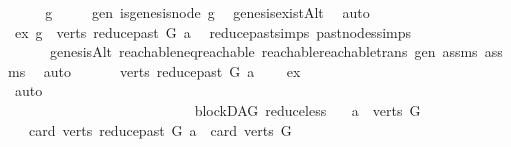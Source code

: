 \begin{isabellebody}
%
\endisadelimproof
%
\isatagproof
{}\isamarkupfalse%
\ {\isacharminus}{\kern0pt}\isanewline
\ \ \isamarkupfalse%
\ g\isanewline
\ \ \ \ \ gen{\isacharcolon}{\kern0pt}\ {\isachardoublequoteopen}is{\isacharunderscore}{\kern0pt}genesis{\isacharunderscore}{\kern0pt}node\ g{\isachardoublequoteclose}\ \isamarkupfalse%
\ genesis{\isacharunderscore}{\kern0pt}existAlt\ \isamarkupfalse%
\ auto\isanewline
\ \ \isamarkupfalse%
\ ex{\isacharcolon}{\kern0pt}\ {\isachardoublequoteopen}g\ {\isasymin}\ verts\ {\isacharparenleft}{\kern0pt}reduce{\isacharunderscore}{\kern0pt}past\ G\ a{\isacharparenright}{\kern0pt}{\isachardoublequoteclose}\ \isamarkupfalse%
\ reduce{\isacharunderscore}{\kern0pt}past{\isachardot}{\kern0pt}simps\ past{\isacharunderscore}{\kern0pt}nodes{\isachardot}{\kern0pt}simps\ \isanewline
\ \ \ \ \ \ genesisAlt\ reachable{\isacharunderscore}{\kern0pt}neq{\isacharunderscore}{\kern0pt}reachable{}\ reachable{\isacharunderscore}{\kern0pt}reachable{}{\isacharunderscore}{\kern0pt}trans\ gen\ assms{\isacharparenleft}{\kern0pt}{}{\isacharparenright}{\kern0pt}\ assms{\isacharparenleft}{\kern0pt}{}{\isacharparenright}{\kern0pt}\ \isamarkupfalse%
\ auto\ \isanewline
\ \ \isamarkupfalse%
\ \isamarkupfalse%
\ {\isachardoublequoteopen}{\isacharparenleft}{\kern0pt}verts\ {\isacharparenleft}{\kern0pt}reduce{\isacharunderscore}{\kern0pt}past\ G\ a{\isacharparenright}{\kern0pt}{\isacharparenright}{\kern0pt}\ {\isasymnoteq}\ {\isacharbraceleft}{\kern0pt}{\isacharbraceright}{\kern0pt}{\isachardoublequoteclose}\ \isamarkupfalse%
\ ex\ \isamarkupfalse%
\ auto\ \ \ \ \ \ \ \ \ \ \ \ \ \ \ \ \ \ \ \ \ \ \ \ \ \ \ \ \ \ \ \ \ \ \ \ \ \ \ \ \ \ \ \ \ \ \ \ \ \ \ \ \ \ \ \ \ \ \ \ \ \ \ \ \ \ \ \ \ \ \ \ \ \ \ \ \ \ \ \ \ \ \ \ \ \ \ \ \ \ \ \isanewline
{}\isamarkupfalse%
%
\endisatagproof
{\isafoldproof}%
%
\isadelimproof
\isanewline
%
\endisadelimproof
\isanewline
{}\isamarkupfalse%
\ {\isacharparenleft}{\kern0pt}\ blockDAG{\isacharparenright}{\kern0pt}\ reduce{\isacharunderscore}{\kern0pt}less{\isacharcolon}{\kern0pt}\isanewline
\ \ \ {\isachardoublequoteopen}a\ {\isasymin}\ verts\ G{\isachardoublequoteclose}\isanewline
\ \ \ {\isachardoublequoteopen}card\ {\isacharparenleft}{\kern0pt}verts\ {\isacharparenleft}{\kern0pt}reduce{\isacharunderscore}{\kern0pt}past\ G\ a{\isacharparenright}{\kern0pt}{\isacharparenright}{\kern0pt}\ {\isacharless}{\kern0pt}\ card\ {\isacharparenleft}{\kern0pt}verts\ G{\isacharparenright}{\kern0pt}{\isachardoublequoteclose}\isanewline

\end{isabellebody}
